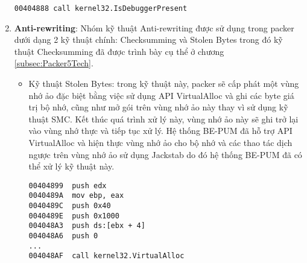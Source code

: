 \begin{enumerate}
{\begin{itemize}
{\begin{code}
\begin{lstlisting}[captionpos=b,caption={Kỹ thuật Anti-debugging sử dụng trong packer YODA},label={lst:ADinYODA},frame=single]
00404888 call kernel32.IsDebuggerPresent
\end{lstlisting}
\end{code}
}
\end{itemize}
}
\item{\textbf{Anti-rewriting}: Nhóm kỹ thuật Anti-rewriting được sử dụng trong packer dưới dạng 2 kỹ thuật chính: Checksumming và Stolen Bytes trong đó kỹ thuật Checksumming đã được trình bày cụ thể ở chương \ref {subsec:Packer5Tech}.
\begin{itemize}
\item{Kỹ thuật Stolen Bytes: trong kỹ thuật này, packer sẽ cấp phát một vùng nhớ ảo đặc biệt bằng việc sử dụng API VirtualAlloc và ghi các byte giá trị bộ nhớ, cũng như mở gói trên vùng nhớ ảo này thay vì sử dụng kỹ thuật SMC. Kết thúc quá trình xử lý này, vùng nhớ ảo này sẽ ghi trở lại vào vùng nhớ thực và tiếp tục xử lý. Hệ thống BE-PUM đã hỗ trợ API VirtualAlloc và hiện thực vùng nhớ ảo cho bộ nhớ và các thao tác dịch ngược trên vùng nhớ ảo sử dụng Jackstab do đó hệ thống BE-PUM đã có thể xử lý kỹ thuật này.
\begin{code}
\begin{lstlisting}[captionpos=b,caption={Kỹ thuật Stolen Bytes sử dụng trong packer PECOMPACT},label={lst:SBinPECOMPACT},frame=single]
00404899  push edx
0040489A  mov ebp, eax
0040489C  push 0x40
0040489E  push 0x1000
004048A3  push ds:[ebx + 4]
004048A6  push 0
...   
004048AF  call kernel32.VirtualAlloc
\end{lstlisting}
\end{code}
}
\end{itemize}
}
\end{enumerate}

